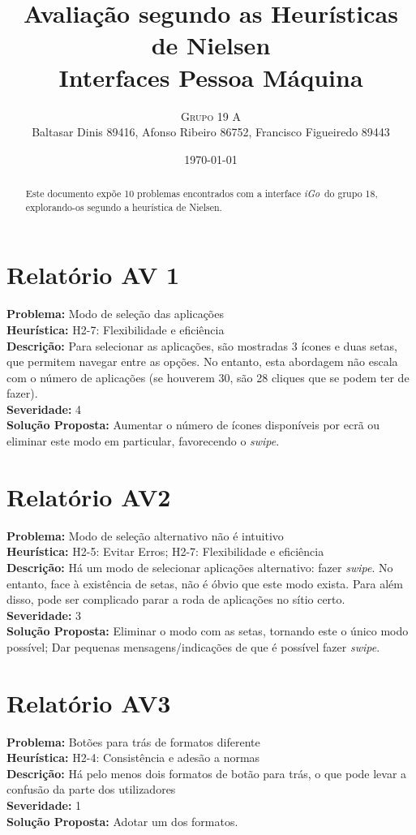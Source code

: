 \documentclass[a4paper]{article}
\title{Avaliação segundo as Heurísticas de Nielsen\\\small Interfaces Pessoa Máquina}
\author{\textsc{Grupo 19 A}\\Baltasar Dinis 89416, Afonso Ribeiro 86752, Francisco Figueiredo 89443}
\date{\today}
\newcommand{\igo}{\textit{iGo}}
\begin{document}
\maketitle

\begin{abstract}
  Este documento expõe 10 problemas encontrados com a interface \igo\  do grupo
  18, explorando-os segundo a heurística de Nielsen.
\end{abstract}

\begin{multicols}{2}
\section*{Relatório AV 1}
\textbf{Problema:} Modo de seleção das aplicações\\
\textbf{Heurística:} H2-7: Flexibilidade e eficiência\\
\textbf{Descrição:} Para selecionar as aplicações, são mostradas 3 ícones e duas setas, que permitem navegar entre as opções. No entanto, esta abordagem não escala com o número de aplicações (se houverem 30, são 28 cliques que se podem ter de fazer).\\
\textbf{Severidade:} 4\\
\textbf{Solução Proposta:} Aumentar o número de ícones disponíveis por ecrã ou
  eliminar este modo em particular, favorecendo o \textit{swipe}.

\section*{Relatório AV2}
\textbf{Problema:} Modo de seleção alternativo não é intuitivo\\
\textbf{Heurística:} H2-5: Evitar Erros; H2-7: Flexibilidade e eficiência\\
\textbf{Descrição:} Há um modo de selecionar aplicações alternativo: fazer
  \textit{swipe}. No entanto, face à existência de setas, não é óbvio que este modo exista. Para além disso, pode ser complicado parar a roda de aplicações no sítio certo.\\
\textbf{Severidade:} 3\\
\textbf{Solução Proposta:} Eliminar o modo com as setas, tornando este o único
  modo possível; Dar pequenas mensagens/indicações de que é possível fazer
  \textit{swipe}.

\section*{Relatório AV3}
\textbf{Problema:} Botões para trás de formatos diferente\\
\textbf{Heurística:} H2-4: Consistência e adesão a normas\\
\textbf{Descrição:} Há pelo menos dois formatos de botão para trás, o que pode levar a confusão da parte dos utilizadores\\
\textbf{Severidade:} 1\\
\textbf{Solução Proposta:} Adotar um dos formatos.


\end{multicols}
\end{document}
